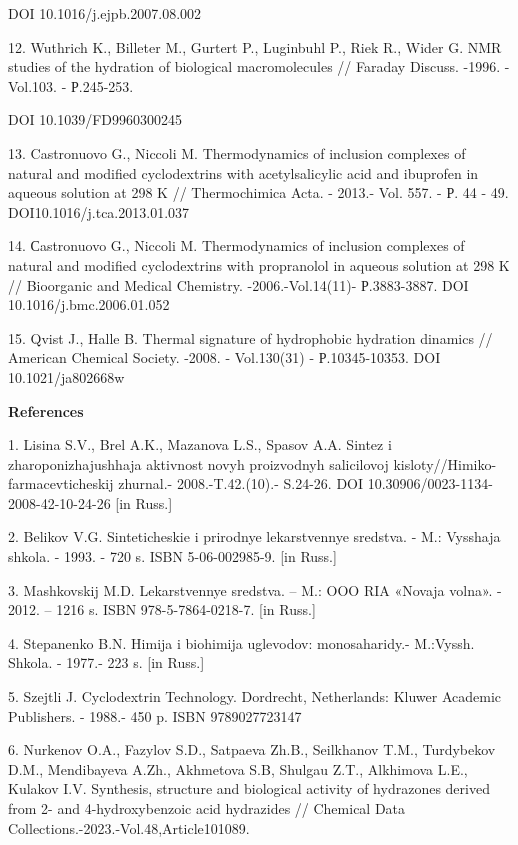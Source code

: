 DOI 10.1016/j.ejpb.2007.08.002

12. Wuthrich K., Billeter M., Gurtert P., Luginbuhl P., Riek R., Wider
G. NMR studies of the hydration of biological macromolecules // Faraday
Discuss. -1996. - Vol.103. - Р.245-253.

DOI 10.1039/FD9960300245

13. Castronuovo G., Niccoli M. Thermodynamics of inclusion complexes of
natural and modified cyclodextrins with acetylsalicylic acid and
ibuprofen in aqueous solution at 298 K // Thermochimica Acta. - 2013.-
Vol. 557. - Р. 44 - 49. DOI10.1016/j.tca.2013.01.037

14. Сastronuovo G., Niccoli M. Thermodynamics of inclusion complexes of
natural and modified cyclodextrins with propranolol in aqueous solution
at 298 K // Bioorganic and Medical Chemistry. -2006.-Vol.14(11)-
Р.3883-3887. DOI 10.1016/j.bmc.2006.01.052~

15. Qvist J., Halle B. Thermal signature of hydrophobic hydration
dinamics // American Chemical Society. -2008. - Vol.130(31) -
Р.10345-10353. DOI 10.1021/ja802668w

{\bfseries References}

1. Lisina S.V., Brel\textquotesingle{} A.K., Mazanova L.S., Spasov A.A.
Sintez i zharoponizhajushhaja aktivnost\textquotesingle{} novyh
proizvodnyh salicilovoj kisloty//Himiko-farmacevticheskij zhurnal.-
2008.-T.42.(10).- S.24-26. DOI 10.30906/0023-1134-2008-42-10-24-26 {[}in
Russ.{]}

2. Belikov V.G. Sinteticheskie i prirodnye lekarstvennye sredstva. - M.:
Vysshaja shkola. - 1993. - 720 s. ISBN 5-06-002985-9. {[}in Russ.{]}

3. Mashkovskij M.D. Lekarstvennye sredstva. -- M.: OOO RIA «Novaja
volna». - 2012. -- 1216 s. ISBN 978-5-7864-0218-7. {[}in Russ.{]}

4. Stepanenko B.N. Himija i biohimija uglevodov: monosaharidy.-
M.:Vyssh. Shkola. - 1977.- 223 s. {[}in Russ.{]}

5. Szejtli J. Cyclodextrin Technology. Dordrecht, Netherlands: Kluwer
Academic Publishers. - 1988.- 450 p. ISBN 9789027723147

6. Nurkenov O.A., Fazylov S.D., Satpaeva Zh.B., Seilkhanov T.M.,
Turdybekov D.M., Mendibayeva A.Zh., Akhmetova S.B, Shulgau Z.T.,
Alkhimova L.E., Kulakov I.V. Synthesis, structure and biological
activity of hydrazones derived from 2- and 4-hydroxybenzoic acid
hydrazides // Chemical Data Collections.-2023.-Vol.48,Article101089.

